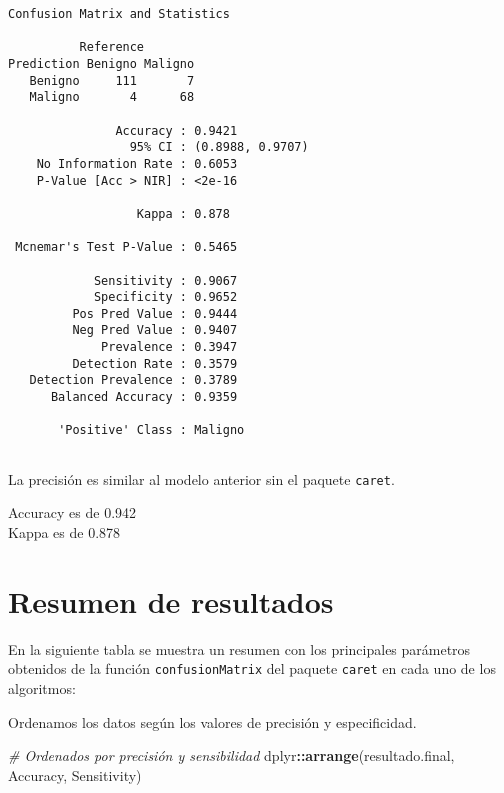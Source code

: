 \documentclass[
]{article}
\newenvironment{Shaded}{\begin{snugshade}}{\end{snugshade}}
\newcommand{\CommentTok}[1]{\textcolor[rgb]{0.56,0.35,0.01}{\textit{#1}}}
\newcommand{\KeywordTok}[1]{\textcolor[rgb]{0.13,0.29,0.53}{\textbf{#1}}}
\newcommand{\NormalTok}[1]{#1}
\newcommand{\OperatorTok}[1]{\textcolor[rgb]{0.81,0.36,0.00}{\textbf{#1}}}
\begin{document}
\begin{verbatim}
Confusion Matrix and Statistics

          Reference
Prediction Benigno Maligno
   Benigno     111       7
   Maligno       4      68
                                          
               Accuracy : 0.9421          
                 95% CI : (0.8988, 0.9707)
    No Information Rate : 0.6053          
    P-Value [Acc > NIR] : <2e-16          
                                          
                  Kappa : 0.878           
                                          
 Mcnemar's Test P-Value : 0.5465          
                                          
            Sensitivity : 0.9067          
            Specificity : 0.9652          
         Pos Pred Value : 0.9444          
         Neg Pred Value : 0.9407          
             Prevalence : 0.3947          
         Detection Rate : 0.3579          
   Detection Prevalence : 0.3789          
      Balanced Accuracy : 0.9359          
                                          
       'Positive' Class : Maligno         
                                          
\end{verbatim}

La precisión es similar al modelo anterior sin el paquete
\texttt{caret}.

Accuracy es de 0.942\\
Kappa es de 0.878

\hypertarget{resumen-de-resultados}{%
\section{Resumen de resultados}\label{resumen-de-resultados}}

En la siguiente tabla se muestra un resumen con los principales
parámetros obtenidos de la función \texttt{confusionMatrix} del paquete
\texttt{caret} en cada uno de los algoritmos:

Ordenamos los datos según los valores de precisión y especificidad.

\begin{Shaded}
\begin{Highlighting}[]
\CommentTok{# Ordenados por precisión y sensibilidad}
\NormalTok{dplyr}\OperatorTok{::}\KeywordTok{arrange}\NormalTok{(resultado.final, Accuracy, Sensitivity)}
\end{Highlighting}
\end{Shaded}
\end{document}
